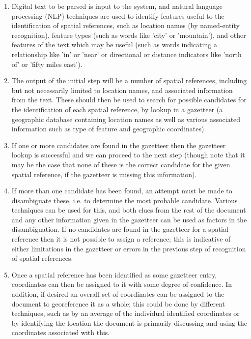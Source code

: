 \documentclass[12pt, a4paper]{report}
\begin{document}
\begin{enumerate}
	\item {Digital text to be parsed is input to the system, and natural language processing (NLP) techniques are used to identify features useful to the identification of spatial references, such as location names (by named-entity recognition), feature types (such as words like 'city' or 'mountain'), and other features of the text which may be useful (such as words indicating a relationship like 'in' or 'near' or directional or distance indicators like 'north of' or 'fifty miles east').}
	\item {The output of the initial step will be a number of spatial references, including but not necessarily limited to location names, and associated information from the text. These should then be used to search for possible candidates for the identification of each spatial reference, by lookup in a gazetteer (a geographic database containing location names as well as various associated information such as type of feature and geographic coordinates).}
	\item {If one or more candidates are found in the gazetteer then the gazetteer lookup is successful and we can proceed to the next step (though note that it may be the case that none of these is the correct candidate for the given spatial reference, if the gazetteer is missing this information).}
	\item {If more than one candidate has been found, an attempt must be made to disambiguate these, i.e. to determine the most probable candidate. Various techniques can be used for this, and both clues from the rest of the document and any other information given in the gazetteer can be used as factors in the disambiguation. If no candidates are found in the gazetteer for a spatial reference then it is not possible to assign a reference; this is indicative of either limitations in the gazetteer or errors in the previous step of recognition of spatial references.}
	\item {Once a spatial reference has been identified as some gazetteer entry, coordinates can then be assigned to it with some degree of confidence. In addition, if desired an overall set of coordinates can be assigned to the document to georeference it as a whole; this could be done by different techniques, such as by an average of the individual identified coordinates or by identifying the location the document is primarily discussing and using the coordinates associated with this.}
\end{enumerate}
\end{document}
